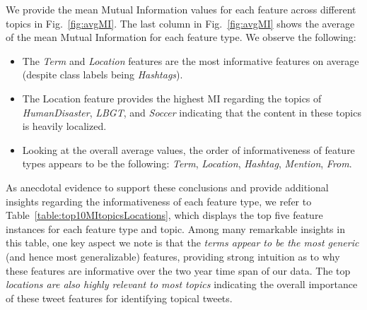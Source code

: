 We provide the mean Mutual Information
values for each feature across different topics in Fig.~\ref{fig:avgMI}.
The last column in Fig.~\ref{fig:avgMI} shows the
average of the mean Mutual Information for each feature type.  We observe
the following:
\begin{itemize}%
\item The \textit{Term} and \textit{Location} features are the most informative features on average (despite class labels being \emph{Hashtags}).%
\item The Location feature provides the highest MI regarding the topics of \textit{HumanDisaster}, \textit{LBGT}, and \textit{Soccer} indicating that the content in these topics is heavily localized.
\item Looking at the overall average values, the order of informativeness of feature types appears to be the following: \textit{Term}, \textit{Location}, \textit{Hashtag}, \textit{Mention}, \textit{From}.
\end{itemize}

As anecdotal evidence to support these conclusions and provide additional insights regarding
the informativeness of each feature type, we refer to
Table~\ref{table:top10MItopicsLocations}, which displays the top five feature instances
for each feature type and topic.  Among many remarkable insights in this table, one key aspect  
we note is that the \emph{terms appear to be the most generic} (and hence most generalizable) features,
providing strong intuition as to why these features are informative over the two year time
span of our data.  The top \emph{locations are also highly relevant to most topics} indicating
the overall importance of these tweet features for identifying topical tweets.


